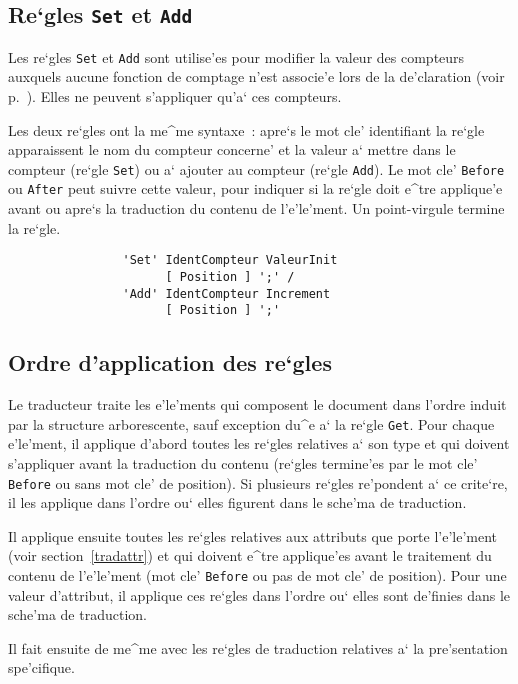 {\subsection{Re`gles {\tt Set} et {\tt Add}}
\label{setandadd}

Les re`gles {\tt Set} et {\tt Add} sont utilise'es pour modifier la
valeur des compteurs auxquels aucune fonction de comptage n'est
associe'e lors de la de'claration (voir p.~\pageref{compteurs}).
Elles ne peuvent s'appliquer qu'a` ces compteurs.

Les deux re`gles ont la me^me syntaxe~: apre`s le mot cle' identifiant
la re`gle apparaissent le nom du compteur concerne' et la valeur
a` mettre dans le compteur (re`gle {\tt Set}) ou a` ajouter au compteur
(re`gle {\tt Add}). Le mot cle' {\tt Before} ou {\tt After} peut suivre
cette valeur, pour indiquer si la re`gle doit e^tre applique'e avant
ou apre`s la traduction du contenu de l'e'le'ment. Un point-virgule termine
la re`gle.

\begin{verbatim}
                'Set' IdentCompteur ValeurInit
                      [ Position ] ';' /
                'Add' IdentCompteur Increment
                      [ Position ] ';'
\end{verbatim}

\subsection{Ordre d'application des re`gles}
\label{ordreappli}

Le traducteur traite les e'le'ments qui composent le document dans l'ordre
induit par la structure arborescente, sauf exception du^e a` la re`gle
{\tt Get}. Pour chaque e'le'ment, il applique d'abord toutes les re`gles
relatives a` son type et qui doivent s'appliquer avant la traduction du
contenu (re`gles termine'es par le mot cle' {\tt Before} ou sans mot cle' de
position). Si plusieurs re`gles re'pondent a` ce crite`re, il les applique
dans l'ordre ou` elles figurent dans le sche'ma de traduction.

Il applique ensuite toutes les re`gles relatives aux attributs que porte
l'e'le'ment (voir section~\ref{tradattr}) et qui doivent e^tre applique'es
avant le traitement du contenu de l'e'le'ment (mot cle' {\tt Before} ou pas
de mot cle' de position).
Pour une valeur d'attribut, il applique ces re`gles dans l'ordre ou` elles
sont de'finies dans le sche'ma de traduction.

Il fait ensuite de me^me avec les re`gles de traduction relatives a`
la pre'sentation spe'cifique.

}
